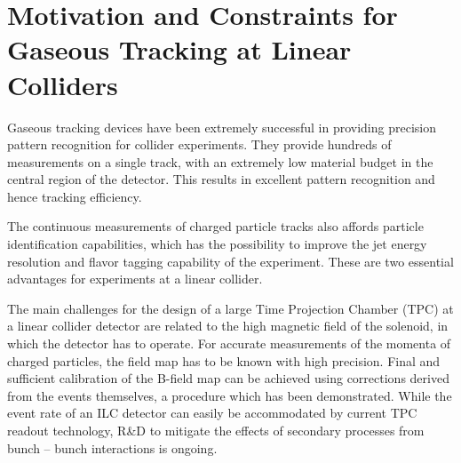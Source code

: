 \section{Motivation and Constraints for Gaseous Tracking at Linear Colliders}

Gaseous tracking devices have been extremely successful in providing precision pattern recognition for collider experiments. They provide hundreds of measurements on a single track, with an extremely low material budget in the central region of the detector. This results in excellent pattern recognition and hence tracking efficiency.

The continuous measurements of charged particle tracks also affords particle identification capabilities, which has the possibility to improve the jet energy resolution and flavor tagging capability of the experiment. These are two essential advantages for experiments at a linear collider.

The main challenges for the design of a large Time Projection Chamber (TPC) at a linear collider detector are related to the high magnetic field of the solenoid, in which the detector has to operate. For accurate measurements of the momenta of charged particles, the field map has to be known with high precision. Final and sufficient calibration of the B-field map can be achieved using corrections derived from the events themselves, a procedure which has been demonstrated. While the event rate of an ILC detector can easily be accommodated by current TPC readout technology, R\&D to mitigate the effects of secondary processes from bunch -- bunch interactions is ongoing.
